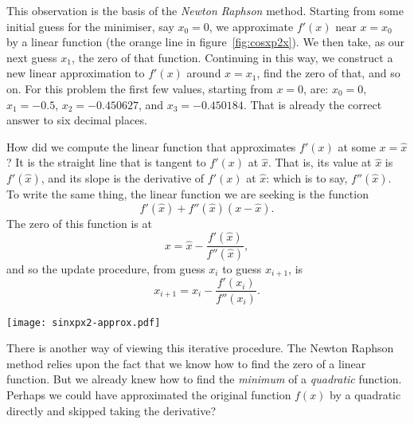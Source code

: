 \documentclass[10pt, a4paper]{article}
\begin{document}
This observation is the basis of the \emph{Newton Raphson}
method. Starting from some initial guess for the minimiser, say
$x_0=0$, we approximate $f'(x)$ near $x=x_0$ by a linear function (the
orange line in figure~\ref{fig:cosxp2x}). We then take, as our next
guess $x_1$, the zero of that function. Continuing in this way, we
construct a new linear approximation to $f'(x)$ around $x=x_1$, find
the zero of that, and so on. For this problem the first few values,
starting from $x=0$, are: $x_0=0$, $x_1=-0.5$, $x_2= -0.450627$, and
$x_3 = -0.450184$. That is already the correct answer to six decimal
places.

How did we compute the linear function that approximates $f'(x)$ at
some $x=\hat{x}$? It is the straight line that is tangent to $f'(x)$
at $\hat{x}$. That is, its value at $\hat{x}$ is $f'(\hat{x})$, and
its slope is the derivative of $f'(x)$ at $\hat{x}$: which is to say,
$f''(\hat{x})$. To write the same thing, the linear function we are
seeking is the function
\begin{equation*}
  f'(\hat{x}) + f''(\hat{x})(x - \hat{x}).
\end{equation*}
The zero of this function is at
\begin{equation}
  x = \hat{x} - \frac{f'(\hat{x})}{f''(\hat{x})},
  \label{eq:linearroot}
\end{equation}
and so the update procedure, from guess $x_i$ to guess $x_{i+1}$, is
\begin{equation}
  x_{i+1} = x_i - \frac{f'(x_i)}{f''(x_i)}.
  \label{eq:newtonraphson}
\end{equation}

\begin{marginfigure}
  \centering
  \texttt{[image: sinxpx2-approx.pdf]}
\end{marginfigure}

There is another way of viewing this iterative procedure. The Newton
Raphson method relies upon the fact that we know how to find the zero
of a linear function. But we already knew how to find the
\emph{minimum} of a \emph{quadratic} function. Perhaps we could have approximated the original
function $f(x)$ by a quadratic directly and skipped taking the
derivative?
\end{document}
